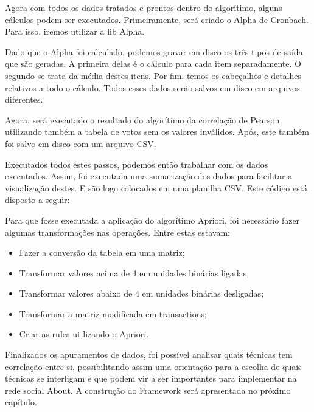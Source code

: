Agora com todos os dados tratados e prontos dentro do algorítimo, alguns cálculos podem
ser executados. Primeiramente, será criado o Alpha de Cronbach. Para isso, iremos utilizar
a lib Alpha. 



Dado que o Alpha foi calculado, podemos gravar em disco os três tipos de saída que são geradas.
A primeira delas é o cálculo para cada item separadamente. O segundo se trata da média destes
itens. Por fim, temos os cabeçalhos e detalhes relativos a todo o cálculo. Todos esses dados serão
salvos em disco em arquivos diferentes. 



Agora, será executado o resultado do algorítimo da correlação de Pearson, utilizando
também a tabela de votos sem os valores inválidos. Após, este também foi salvo em disco
com um arquivo CSV.



Executados todos estes passos, podemos então trabalhar com os dados executados.
Assim, foi executada uma sumarização dos dados para facilitar a visualização destes.
E são logo colocados em uma planilha CSV. Este código está disposto a seguir:



Para que fosse executada a aplicação do algorítimo Apriori, foi necessário fazer
algumas transformações nas operações. Entre estas estavam:

\begin{itemize}
    \item Fazer a conversão da tabela em uma matriz;
    \item Transformar valores acima de 4 em unidades binárias ligadas;
    \item Transformar valores abaixo de 4 em unidades binárias desligadas;
    \item Transformar a matriz modificada em transactions;
    \item Criar as rules utilizando o Apriori.
\end{itemize}



Finalizados os apuramentos de dados, foi possível analisar quais técnicas tem correlação
entre si, possibilitando assim uma orientação para a escolha de quais técnicas se interligam
e que podem vir a ser importantes para implementar na rede social About. A construção
do Framework será apresentada no próximo capítulo.

